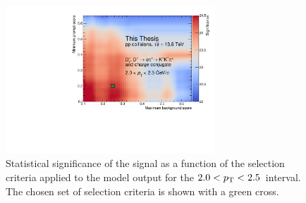 \begin{figure}
    \centering
    \includegraphics[width=0.7\textwidth]{Figures/Chapter 5/Significance_Scan_2_2p5.pdf}
    \caption{Statistical significance of the signal as a function of the selection criteria applied to the model output for the $2.0<p_\mathrm{T}<2.5$~\gevc interval. The chosen set of selection criteria is shown with a green cross.}
    \label{fig:ml_significance}
\end{figure}

\begin{table}[b!]
    \centering
    \caption{Selection criteria applied to enhance the significance of the $\ds$ meson signal in the $\pt$ intervals considered for the analysis.}
    \label{tab:working_point}
    \vspace*{0.3cm}
\end{table}

